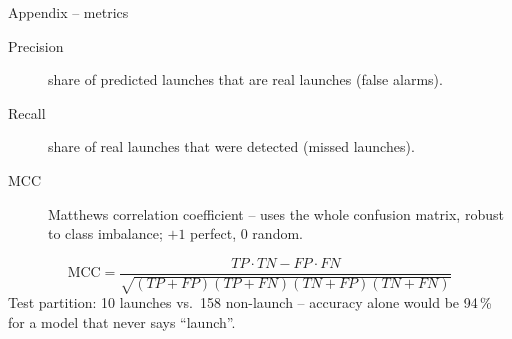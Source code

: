 \documentclass[aspectratio=169,10pt]{beamer}
\begin{document}
\begin{frame}{Appendix -- metrics}
  \begin{description}
    \item[Precision] share of predicted launches that are real launches (false alarms).
    \item[Recall] share of real launches that were detected (missed launches).
    \item[MCC] Matthews correlation coefficient -- uses the whole confusion matrix,
      robust to class imbalance; $+1$ perfect, $0$ random.
  \end{description}
  \[ \text{MCC} = \frac{TP\cdot TN - FP\cdot FN}
      {\sqrt{(TP+FP)(TP+FN)(TN+FP)(TN+FN)}} \]
  \vfill
  {\small\color{gray} Test partition: 10 launches vs.\ 158 non-launch -- accuracy alone
   would be 94\,\% for a model that never says ``launch''.}
\end{frame}
\end{document}
